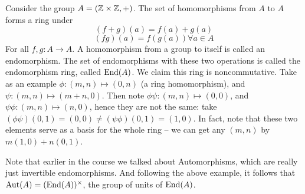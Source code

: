 \begin{example}
  Consider the group $A=(\mathbb Z\times\mathbb Z, +)$. The set of
  homomorphisms from $A$ to $A$ forms a ring under 
  \[(f+g)(a)= f(a)+g(a)\]
  \[(fg)(a) = f(g(a)) \forall a\in A\]
  For all $f,g:A\to A$. A homomorphism from a group to itself is called an
  endomorphism. The set of endomorphisms with these two operations is called the
  endomorphism ring, called $\operatorname{End}(A)$. We claim this ring is noncommutative. Take as
  an example $\phi:(m,n)\mapsto (0,n)$ (a ring homomorphism), and $\psi:(m,n)\mapsto
  (m+n,0)$. Then note $\phi\psi:(m,n)\mapsto (0,0)$, and $\psi\phi:(m,n)\mapsto (n,0)$,
  hence they are not the same: take $(\phi\psi)(0,1)=(0,0)\neq
  (\psi\phi)(0,1)=(1,0)$. In fact, note that these two elements serve as a basis for the
  whole ring -- we can get any $(m,n)$ by $m(1,0)+n(0,1)$.
\end{example}

Note that earlier in the course we talked about Automorphisms, which are really just
invertible endomorphisms. And following the above example, it follows that
$\operatorname{Aut}(A)=(\operatorname{End}(A))^{\times}$, the group of units of $\operatorname{End}(A)$.
